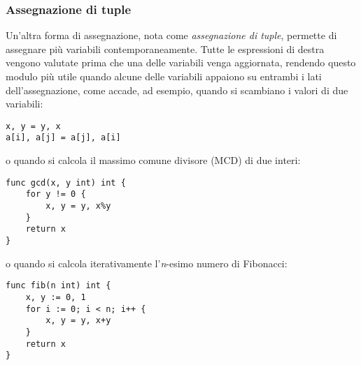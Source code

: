 \documentclass[../../../thesis.tex]{subfiles}
\begin{document}
    \subsubsection{Assegnazione di tuple}
    Un'altra forma di assegnazione, nota come \textit{assegnazione di tuple}, permette di assegnare più variabili contemporaneamente.
    Tutte le espressioni di destra vengono valutate prima che una delle variabili venga aggiornata, rendendo questo modulo più utile quando alcune delle variabili appaiono su entrambi i lati dell'assegnazione, come accade, ad esempio, quando si scambiano i valori di due variabili:
    \begin{lstlisting}[frame = single, label = {lst:lstlisting1-4-1.1}]
x, y = y, x
a[i], a[j] = a[j], a[i]
    \end{lstlisting}
    o quando si calcola il massimo comune divisore (MCD) di due interi:
    \begin{lstlisting}[frame = single, label = {lst:lstlisting1-4-1.2}]
func gcd(x, y int) int {
    for y != 0 {
        x, y = y, x%y
    }
    return x
}
    \end{lstlisting}
    o quando si calcola iterativamente l'\textit{n}-esimo numero di Fibonacci:
    \begin{lstlisting}[frame = single, label = {lst:lstlisting1-4-1.3}]
func fib(n int) int {
    x, y := 0, 1
    for i := 0; i < n; i++ {
        x, y = y, x+y
    }
    return x
}
    \end{lstlisting}
\end{document}
